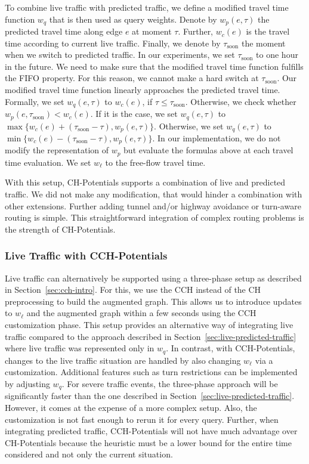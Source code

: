 \documentclass[manuscript,review]{acmart}
\begin{document}
To combine live traffic with predicted traffic, we define a modified travel time function $w_q$ that is then used as query weights.
Denote by $w_p(e,\tau)$ the predicted travel time along edge $e$ at moment $\tau$.
Further, $w_c(e)$ is the travel time according to current live traffic.
Finally, we denote by $\tau_{\mathrm{soon}}$ the moment when we switch to predicted traffic.
In our experiments, we set $\tau_{\mathrm{soon}}$ to one hour in the future.
We need to make sure that the modified travel time function fulfills the FIFO property.
For this reason, we cannot make a hard switch at $\tau_{\mathrm{soon}}$.
Our modified travel time function linearly approaches the predicted travel time. %
%
Formally, we set $w_q(e,\tau)$ to $w_c(e)$, if $\tau \leq \tau_{\mathrm{soon}}$.
Otherwise, we check whether $w_p(e,\tau_{\mathrm{soon}}) < w_c(e)$.
If it is the case, we set $w_q(e,\tau)$ to $\max\{w_c(e)+(\tau_{\mathrm{soon}}-\tau), w_p(e,\tau)\}$.
Otherwise, we set $w_q(e,\tau)$ to $\min\{w_c(e)-(\tau_{\mathrm{soon}}-\tau), w_p(e,\tau)\}$.
In our implementation, we do not modify the representation of $w_p$ but evaluate the formulas above at each travel time evaluation.
We set $w_\ell$ to the free-flow travel time.

With this setup, CH-Potentials supports a combination of live and predicted traffic.
We did not make any modification, that would hinder a combination with other extensions.
Further adding tunnel and/or highway avoidance or turn-aware routing is simple.
This straightforward integration of complex routing problems is the strength of CH-Potentials.

\subsubsection{Live Traffic with CCH-Potentials}

Live traffic can alternatively be supported using a three-phase setup as described in Section~\ref{sec:cch-intro}.
For this, we use the CCH instead of the CH preprocessing to build the augmented graph.
This allows us to introduce updates to $w_\ell$ and the augmented graph within a few seconds using the CCH customization phase.
This setup provides an alternative way of integrating live traffic compared to the approach described in Section~\ref{sec:live-predicted-traffic} where live traffic was represented only in $w_q$.
In contrast, with CCH-Potentials, changes to the live traffic situation are handled by also changing $w_\ell$ via a customization.
Additional features such as turn restrictions can be implemented by adjusting $w_q$.
For severe traffic events, the three-phase approach will be significantly faster than the one described in Section~\ref{sec:live-predicted-traffic}.
However, it comes at the expense of a more complex setup.
Also, the customization is not fast enough to rerun it for every query.
Further, when integrating predicted traffic, CCH-Potentials will not have much advantage over CH-Potentials because the heuristic must be a lower bound for the entire time considered and not only the current situation.
\end{document}
